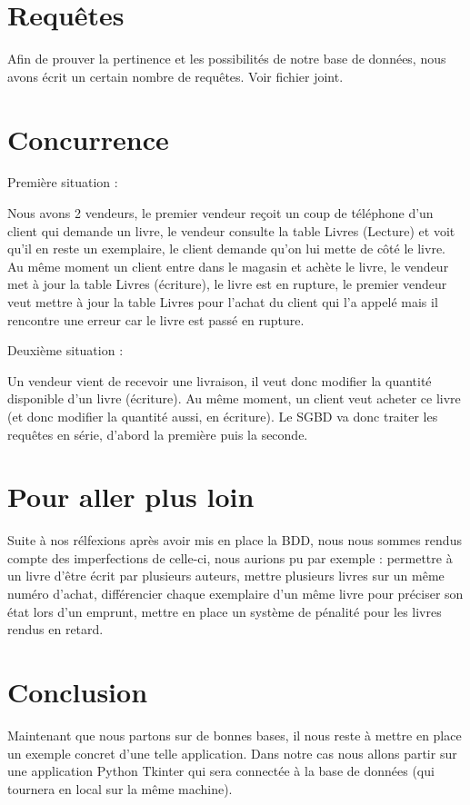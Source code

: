 \documentclass[10pt,a4paper,parskip=full*,DIV=11]{scrartcl}
\begin{document}
\section{Requêtes}
Afin de prouver la pertinence et les possibilités de notre base de données, nous avons écrit un certain nombre de requêtes. Voir fichier joint.

\section{Concurrence}
Première situation :

Nous avons 2 vendeurs, le premier vendeur reçoit un coup de téléphone d'un client qui demande un livre, le vendeur consulte la table Livres (Lecture) et voit qu'il en reste un exemplaire, le client
 demande qu'on lui mette de côté le livre.
Au même moment un client entre dans le magasin et achète le livre, le vendeur met à jour la table Livres (écriture), le livre est en rupture, le premier vendeur veut mettre à jour la table Livres 
pour l'achat du client qui l'a appelé mais il rencontre une erreur car le
livre est passé en rupture.

Deuxième situation :

Un vendeur vient de recevoir une livraison, il veut donc modifier la quantité disponible d'un livre (écriture). Au même moment, un client veut acheter ce livre (et donc modifier la quantité aussi, 
en écriture). Le SGBD va donc traiter les requêtes en série, d'abord la première puis la seconde.

\section{Pour aller plus loin}
Suite à nos rélfexions après avoir mis en place la BDD, nous nous sommes rendus compte des imperfections de celle-ci, nous aurions pu par exemple :
permettre à un livre d'être écrit par plusieurs auteurs, mettre plusieurs livres sur un même numéro d'achat, différencier chaque exemplaire d'un même livre pour préciser son état lors d'un emprunt,
mettre en place un système de pénalité pour les livres rendus en retard.

\section{Conclusion}
Maintenant que nous partons sur de bonnes bases, il nous reste à mettre en place un exemple concret d'une telle application. Dans notre cas nous allons partir sur une application Python Tkinter qui sera
connectée à la base de données (qui tournera en local sur la même machine).
\end{document}

